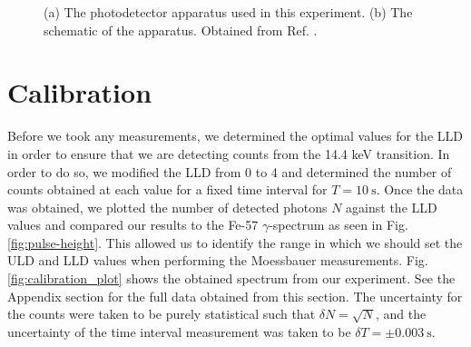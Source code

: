 \documentclass[a4paper]{report}
\numberwithin{equation}{section}
\begin{document}
\begin{figure}[htb!]
	\centering
	\quad
	\centering
	\caption{(a) The photodetector apparatus used in this experiment. (b) The schematic of the apparatus. Obtained from 
			Ref. \cite{k2212016}.}
	\label{fig:apparatus_raw}
\end{figure}


\chapter{Calibration} \label{sec:calibration}

Before we took any measurements, we determined the optimal values for the LLD in order to ensure that we are 
detecting counts from the 14.4 keV transition. In order to do so, we modified the LLD from 0 to 4 and determined the number 
of counts obtained at each value for a fixed time interval for $T = \SI{10}{\second}$. Once the data was obtained, 
we plotted the number of detected photons $N$ against the LLD values and compared our results to the Fe-57 $\gamma$-spectrum as seen in Fig. \ref{fig:pulse-height}.
This allowed us to identify the range in which we should set the ULD and LLD values when performing the Moessbauer measurements. 
 Fig. \ref{fig:calibration_plot} shows the obtained spectrum from our experiment. See the Appendix section for the full data obtained from this 
 section. The uncertainty for the counts were taken to be purely statistical such that $\delta N = \sqrt{N}$, and the uncertainty 
 of the time interval measurement was taken to be $\delta T = \pm \SI{0.003}{\second}$. \par
\end{document}
